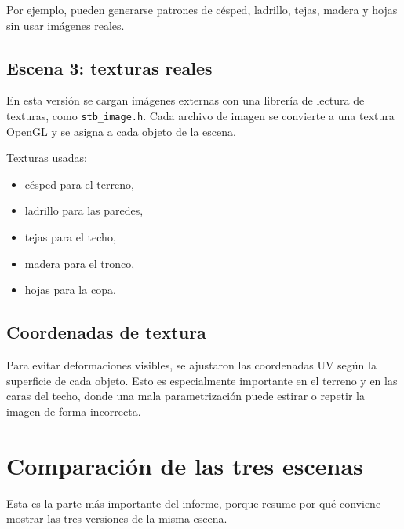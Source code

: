 \documentclass[12pt,a4paper]{article}
\begin{document}
Por ejemplo, pueden generarse patrones de césped, ladrillo, tejas, madera y
hojas sin usar imágenes reales.

\subsection{Escena 3: texturas reales}

En esta versión se cargan imágenes externas con una librería de lectura de
texturas, como \texttt{stb\_image.h}. Cada archivo de imagen se
convierte a una textura OpenGL y se asigna a cada objeto de la escena.

Texturas usadas:

\begin{itemize}[noitemsep]
  \item césped para el terreno,
  \item ladrillo para las paredes,
  \item tejas para el techo,
  \item madera para el tronco,
  \item hojas para la copa.
\end{itemize}

\subsection{Coordenadas de textura}

Para evitar deformaciones visibles, se ajustaron las coordenadas UV según la
superficie de cada objeto. Esto es especialmente importante en el terreno y en
las caras del techo, donde una mala parametrización puede estirar o repetir la
imagen de forma incorrecta.

\section{Comparación de las tres escenas}

Esta es la parte más importante del informe, porque resume por qué conviene
mostrar las tres versiones de la misma escena.
\end{document}
